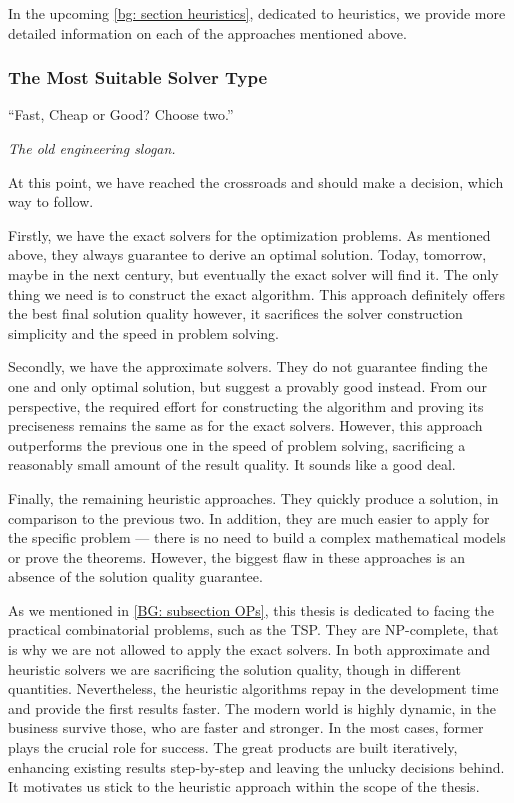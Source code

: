 In the upcoming \cref{bg: section heuristics}, dedicated to heuristics, we provide more detailed information on each of the approaches mentioned above.


\subsubsection{The Most Suitable Solver Type}
\epigraph{``Fast, Cheap or Good? Choose two.''}{\textit{The old engineering slogan.}}

At this point, we have reached the crossroads and should make a decision, which way to follow.

Firstly, we have the exact solvers for the optimization problems. As mentioned above, they always guarantee to derive an optimal solution. Today, tomorrow, maybe in the next century, but eventually the exact solver will find it. The only thing we need is to construct the exact algorithm. This approach definitely offers the best final solution quality however, it sacrifices the solver construction simplicity and the speed in problem solving.

Secondly, we have the approximate solvers. They do not guarantee finding the one and only optimal solution, but suggest a provably good instead. From our perspective, the required effort for constructing the algorithm and proving its preciseness remains the same as for the exact solvers. However, this approach outperforms the previous one in the speed of problem solving, sacrificing a reasonably small amount of the result quality. It sounds like a good deal.

Finally, the remaining heuristic approaches. They quickly produce a solution, in comparison to the previous two. In addition, they are much easier to apply for the specific problem — there is no need to build a complex mathematical models or prove the theorems. However, the biggest flaw in these approaches is an absence of the solution quality guarantee.

As we mentioned in \cref{BG: subsection OPs}, this thesis is dedicated to facing the practical combinatorial problems, such as the TSP. They are NP-complete, that is why we are not allowed to apply the exact solvers. In both approximate and heuristic solvers we are sacrificing the solution quality, though in different quantities. Nevertheless, the heuristic algorithms repay in the development time and provide the first results faster. The modern world is highly dynamic, in the business survive those, who are faster and stronger. In the most cases, former plays the crucial role for success. The great products are built iteratively, enhancing existing results step-by-step and leaving the unlucky decisions behind. It motivates us stick to the heuristic approach within the scope of the thesis.

